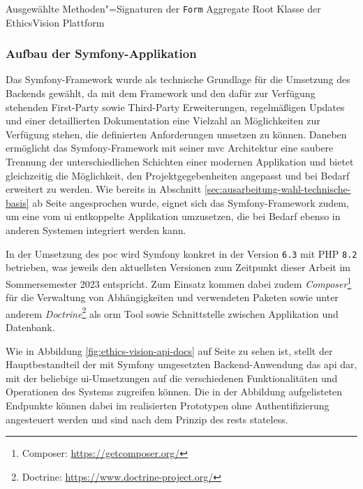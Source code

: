 \documentclass[a4paper,12pt,twoside]{scrreprt}
\begin{document}
\begin{listing}[ht]
    \inputminted[fontsize=\footnotesize,linenos,xleftmargin=8mm]{php}{code/Luidold_Form-Aggregate-Root.php}
    \caption{Ausgewählte Methoden"=Signaturen der \texttt{Form} Aggregate Root Klasse der EthicsVision Plattform}
    \label{code:form-aggregate-root}
\end{listing}

\subsubsection*{Aufbau der Symfony-Applikation}
\label{sub-sub-sec:aufbau-symfony-applikation}

Das Symfony-Framework wurde als technische Grundlage für die Umsetzung des Backends gewählt, da mit dem Framework und den dafür zur Verfügung stehenden First-Party sowie Third-Party Erweiterungen, regelmäßigen Updates und einer detaillierten Dokumentation eine Vielzahl an Möglichkeiten zur Verfügung stehen, die definierten Anforderungen umsetzen zu können. Daneben ermöglicht das Symfony-Framework mit seiner \acl{mvc} Architektur eine saubere Trennung der unterschiedlichen Schichten einer modernen Applikation und bietet gleichzeitig die Möglichkeit, den Projektgegebenheiten angepasst und bei Bedarf erweitert zu werden. Wie bereits in Abschnitt \ref{sec:ausarbeitung-wahl-technische-basis} ab Seite \pageref{sec:ausarbeitung-wahl-technische-basis} angesprochen wurde, eignet sich das Symfony-Framework zudem, um eine vom \acl{ui} entkoppelte Applikation umzusetzen, die bei Bedarf ebenso in anderen Systemen integriert werden kann. \cite{symfony_sas_six-reasons_2023, kszczanowicz_why_2021} 

In der Umsetzung des \ac{poc} wird Symfony konkret in der Version \texttt{6.3} mit PHP \texttt{8.2} betrieben, was jeweils den aktuellsten Versionen zum Zeitpunkt dieser Arbeit im Sommersemester 2023 entspricht. Zum Einsatz kommen dabei zudem \textit{Composer}\footnote{Composer: \url{https://getcomposer.org/}} für die Verwaltung von Abhängigkeiten und verwendeten Paketen sowie unter anderem \textit{Doctrine}\footnote{Doctrine: \url{https://www.doctrine-project.org/}} als \ac{orm} Tool sowie Schnittstelle zwischen Applikation und Datenbank.

\medskip

Wie in Abbildung \ref{fig:ethics-vision-api-docs} auf Seite \pageref{fig:ethics-vision-api-docs} zu sehen ist, stellt der Hauptbestandteil der mit Symfony umgesetzten Backend-Anwendung das \ac{api} dar, mit der beliebige \ac{ui}-Umsetzungen auf die verschiedenen Funktionalitäten und Operationen des Systems zugreifen können. Die in der Abbildung aufgelisteten Endpunkte können dabei im realisierten Prototypen ohne Authentifizierung angesteuert werden und sind nach dem Prinzip des \acp{rest} stateless. \cite{gupta_stateless_2018}
\end{document}
